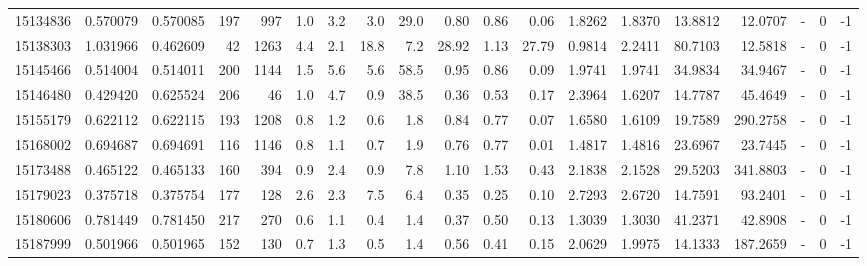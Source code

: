 \begin{tabular}{rrrrrrrrrrrrrrrrlrr}
  15134836 & 0.570079 &   0.570085 &  197 &  997 &      1.0 &      3.2 &     3.0 &     29.0 &       0.80 &        0.86 &        0.06 &  1.8262 &  1.8370 &   13.8812 &   12.0707 &             - &        0 &         -1 \\
  15138303 & 1.031966 &   0.462609 &   42 & 1263 &      4.4 &      2.1 &    18.8 &      7.2 &      28.92 &        1.13 &       27.79 &  0.9814 &  2.2411 &   80.7103 &   12.5818 &             - &        0 &         -1 \\
  15145466 & 0.514004 &   0.514011 &  200 & 1144 &      1.5 &      5.6 &     5.6 &     58.5 &       0.95 &        0.86 &        0.09 &  1.9741 &  1.9741 &   34.9834 &   34.9467 &             - &        0 &         -1 \\
  15146480 & 0.429420 &   0.625524 &  206 &   46 &      1.0 &      4.7 &     0.9 &     38.5 &       0.36 &        0.53 &        0.17 &  2.3964 &  1.6207 &   14.7787 &   45.4649 &             - &        0 &         -1 \\
  15155179 & 0.622112 &   0.622115 &  193 & 1208 &      0.8 &      1.2 &     0.6 &      1.8 &       0.84 &        0.77 &        0.07 &  1.6580 &  1.6109 &   19.7589 &  290.2758 &             - &        0 &         -1 \\
  15168002 & 0.694687 &   0.694691 &  116 & 1146 &      0.8 &      1.1 &     0.7 &      1.9 &       0.76 &        0.77 &        0.01 &  1.4817 &  1.4816 &   23.6967 &   23.7445 &             - &        0 &         -1 \\
  15173488 & 0.465122 &   0.465133 &  160 &  394 &      0.9 &      2.4 &     0.9 &      7.8 &       1.10 &        1.53 &        0.43 &  2.1838 &  2.1528 &   29.5203 &  341.8803 &             - &        0 &         -1 \\
  15179023 & 0.375718 &   0.375754 &  177 &  128 &      2.6 &      2.3 &     7.5 &      6.4 &       0.35 &        0.25 &        0.10 &  2.7293 &  2.6720 &   14.7591 &   93.2401 &             - &        0 &         -1 \\
  15180606 & 0.781449 &   0.781450 &  217 &  270 &      0.6 &      1.1 &     0.4 &      1.4 &       0.37 &        0.50 &        0.13 &  1.3039 &  1.3030 &   41.2371 &   42.8908 &             - &        0 &         -1 \\
  15187999 & 0.501966 &   0.501965 &  152 &  130 &      0.7 &      1.3 &     0.5 &      1.4 &       0.56 &        0.41 &        0.15 &  2.0629 &  1.9975 &   14.1333 &  187.2659 &             - &        0 &         -1 \\

\end{tabular}
